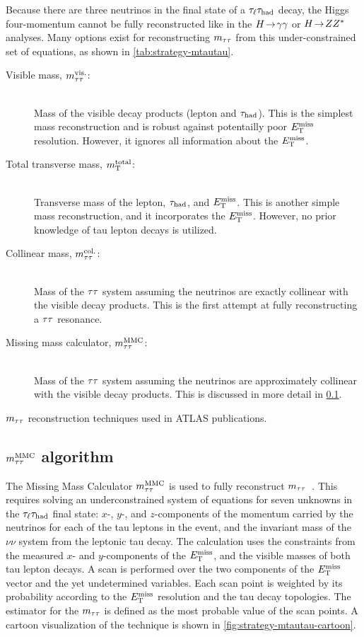 Because there are three neutrinos in the final state of a $\tau_\ell\tau_\text{had}$ decay, the Higgs four-momentum cannot be fully reconstructed like in the $H \!\rightarrow\! \gamma\gamma$ or $H \!\rightarrow\! ZZ^\ast$ analyses. Many options exist for reconstructing $m_{\tau\tau}$ from this under-constrained set of equations, as shown in \cref{tab:strategy-mtautau}.
%
\begin{description}
    \item[Visible mass, $m_{\tau\tau}^\text{vis.}$:] \hfill \\
      Mass of the visible decay products (lepton and $\tau_\text{had}$). This is the simplest mass reconstruction and is robust against potentailly poor $E_{\mathrm{T}}^{\mathrm{miss}}$ resolution. However, it ignores all information about the $E_{\mathrm{T}}^{\mathrm{miss}}$.
    \item[Total transverse mass, $m_{\text{T}}^\text{total}$:] \hfill \\
      Transverse mass of the lepton, $\tau_\text{had}$, and $E_{\mathrm{T}}^{\mathrm{miss}}$. This is another simple mass reconstruction, and it incorporates the $E_{\mathrm{T}}^{\mathrm{miss}}$. However, no prior knowledge of tau lepton decays is utilized.
    \item[Collinear mass, $m_{\tau\tau}^\text{col.}$:] \hfill \\
      Mass of the $\tau\tau$ system assuming the neutrinos are exactly collinear with the visible decay products. This is the first attempt at fully reconstructing a $\tau\tau$ resonance.
    \item[Missing mass calculator, $m_{\tau\tau}^\text{MMC}$:] \hfill \\
      Mass of the $\tau\tau$ system assuming the neutrinos are approximately collinear with the visible decay products. This is discussed in more detail in \cref{sec:strategy-mtautau-mMMC}.
\end{description}
%

\begin{table}[bp]
  \centering
  \renewcommand{\arraystretch}{1.4}
  \caption{$m_{\tau\tau}$ reconstruction techniques used in ATLAS publications.}
  
  \label{tab:strategy-mtautau}
\end{table}

\subsection{$m_{\tau\tau}^\text{MMC}$ algorithm}
\label{sec:strategy-mtautau-mMMC}

The Missing Mass Calculator $m_{\tau\tau}^\text{MMC}$ is used to fully reconstruct $m_{\tau\tau}$~\cite{2011.mmc}. This requires solving an underconstrained system of equations for seven unknowns in the $\tau_\ell\tau_\text{had}$ final state: $x$-, $y$-, and $z$-components of the momentum carried by the neutrinos for each of the tau leptons in the event, and the invariant mass of the $\nu\nu$ system from the leptonic tau decay. The calculation uses the constraints from the measured $x$- and $y$-components of the $E_{\mathrm{T}}^{\mathrm{miss}}$, and the visible masses of both tau lepton decays. A scan is performed over the two components of the $E_{\mathrm{T}}^{\mathrm{miss}}$ vector and the yet undetermined variables. Each scan point is weighted by its probability according to the $E_{\mathrm{T}}^{\mathrm{miss}}$ resolution and the tau decay topologies. The estimator for the $m_{\tau\tau}$ is defined as the most probable value of the scan points. A cartoon visualization of the technique is shown in \cref{fig:strategy-mtautau-cartoon}.

